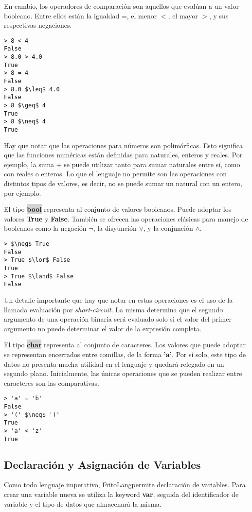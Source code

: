 \documentclass{article}
\newcommand{\Lang}{FritoLang} %
\newcommand{\type}[1]{\colorbox{lightgray}{\textbf{#1}}}
\newcommand{\snot}{$\neg$}
\newcommand{\sand}{$\land$}
\newcommand{\sor}{$\lor$}
\begin{document}
En cambio, los operadores de comparación son aquellos que evalúan a un valor booleano.
Entre ellos están la igualdad =, el menor $<$, el mayor $>$, y sus respectivas negaciones.

\begin{lstlisting}
> 8 < 4
False
> 8.0 > 4.0
True
> 8 = 4
False
> 8.0 $\leq$ 4.0
False
> 8 $\geq$ 4
True
> 8 $\neq$ 4
True
\end{lstlisting}

Hay que notar que las operaciones para números son polimórficas.
Esto significa que las funciones numéricas están definidas para naturales, enteros y reales.
Por ejemplo, la suma + se puede utilizar tanto para sumar naturales entre sí, como con reales o enteros.
Lo que el lenguaje no permite son las operaciones con distintos tipos de valores, es decir, no se puede sumar un natural con un entero, por ejemplo.

El tipo \type{bool} representa al conjunto de valores booleanos.
Puede adoptar los valores \textbf{True} y \textbf{False}.
También se ofrecen las operaciones clásicas para manejo de booleanos como la negación \snot, la disyunción \sor, y la conjunción \sand.

\begin{lstlisting}
> $\neg$ True
False
> True $\lor$ False
True
> True $\land$ False
False
\end{lstlisting}

Un detalle importante que hay que notar en estas operaciones es el uso de la llamada evaluación por \textit{short-circuit}.
La misma determina que el segundo argumento de una operación binaria será evaluado solo si el valor del primer argumento no puede determinar el valor de la expresión completa.

El tipo \type{char} representa al conjunto de caracteres.
Los valores que puede adoptar se representan encerrados entre comillas, de la forma \textbf{'a'}.
Por sí solo, este tipo de datos no presenta mucha utilidad en el lenguaje y quedará relegado en un segundo plano.
Inicialmente, las únicas operaciones que se pueden realizar entre caracteres son las comparativas.

\begin{lstlisting}
> 'a' = 'b'
False
> '(' $\neq$ ')'
True
> 'a' < 'z'
True
\end{lstlisting}

\subsection{Declaración y Asignación de Variables}
Como todo lenguaje imperativo, \Lang\space permite declaración de variables.
Para crear una variable nueva se utiliza la keyword \textbf{var}, seguida del identificador de variable y el tipo de datos que almacenará la misma.
\end{document}
